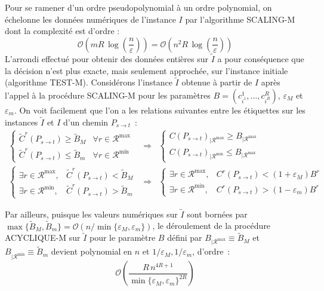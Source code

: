 \documentclass[10pt,francais]{llncs}
\begin{document}
{Pour se ramener d'un ordre pseudopolynomial \`a un ordre polynomial, on \'echelonne les donn\'ees num\'eriques de l'instance $I$ par l'algorithme SCALING-M dont la complexit\'e est d'ordre :
$$\mathcal{O}\left( mR\, \log\left(\frac{n}{\varepsilon}\right) \right) = \mathcal{O}\left( n^2R\, \log\left(\frac{n}{\varepsilon}\right) \right)$$
L'arrondi effectu\'e pour obtenir des donn\'ees enti\`eres sur  $\tilde{I}$ a pour cons\'equence que la d\'ecision n'est plus exacte, mais seulement approch\'ee, sur l'instance initiale (algorithme TEST-M). Consid\'erons l'instance $\tilde{I}$ obtenue \`a partir de $I$ apr\`es l'appel \`a la proc\'edure SCALING-M pour les param\`etres $B=(c^1_{i^1},\ldots,c^R_{i^R})$, $\varepsilon_M$ et $\varepsilon_m$. On voit facilement que l'on a les relations suivantes entre les \'etiquettes sur les instances $\tilde{I}$ et $I$ d'un chemin $P_{s \to t}$~: 
$$\begin{array}{lcl}
\left\{\begin{array}{ll}
\tilde{C}^r(P_{s \to t})\geq \tilde{B}_M	&\forall r\in \mathscr{R}^{\max}\\[7pt]
\tilde{C}^r(P_{s \to t})\leq \tilde{B}_m	&\forall r\in \mathscr{R}^{\min}
\end{array}\right.	
	&\Rightarrow
		&\left\{\begin{array}{ll}
			C(P_{s \to t})_{|\mathscr{R}^{\max}}\geq B_{|\mathscr{R}^{\max}}\\[7pt]
			C(P_{s \to t})_{|\mathscr{R}^{\min}}\leq B_{|\mathscr{R}^{\max}}
			\end{array}\right.\\[20pt]
\left\{\begin{array}{ll}
\exists r\in \mathscr{R}^{\max}, &\tilde{C}^r(P_{s \to t})< \tilde{B}_M\\[7pt]
\exists r\in \mathscr{R}^{\min}, &\tilde{C}^r(P_{s \to t})> \tilde{B}_m
\end{array}\right.	
	&\Rightarrow
		&\left\{\begin{array}{ll}
			\exists r\in \mathscr{R}^{\max}, &C^r(P_{s \to t})< (1+\varepsilon_M)B^r\\[7pt]
			\exists r\in \mathscr{R}^{\min}, &C^r(P_{s \to t})> (1-\varepsilon_m)B^r
\end{array}\right.\end{array}$$

Par ailleurs, puisque les valeurs num\'eriques sur $\tilde{I}$ sont born\'ees par $\max\{\tilde{B}_M, \tilde{B}_m\}= \mathcal{O}(n/\min\{\varepsilon_M,\varepsilon_m\})$, le d\'eroulement de la proc\'edure ACYCLIQUE-M sur $\tilde{I}$ pour le param\`etre $B$ d\'efini par $B_{|\mathscr{R}^{\max}} \equiv \tilde{B}_M$ et $B_{|\mathscr{R}^{\min}} \equiv \tilde{B}_m$ devient polynomial en $n$ et $1/\varepsilon_M,1/\varepsilon_m$, d'ordre~: 
$$\mathcal{O}\left(\frac{R\, n^{4R+1}} {\min\{\varepsilon_M,\varepsilon_m\}^{2R}}\right)$$

}
\end{document}
